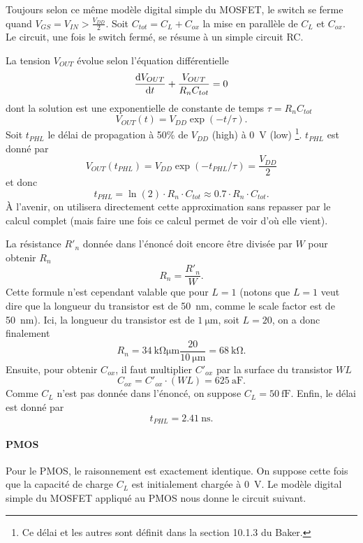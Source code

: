 \documentclass[frenchb,DIV=14]{scrartcl}
\begin{document}
Toujours selon ce même modèle digital simple du MOSFET, le switch se ferme
quand $V_{GS} = V_{IN} > \frac{V_{DD}}{2}$.
Soit $C_{tot} = C_L + C_{ox}$ la mise en parallèle de $C_L$ et $C_{ox}$. Le
circuit, une fois le switch fermé, se résume à un simple circuit RC.

\begin{center}
\end{center}

La tension $V_{OUT}$ évolue selon l'équation différentielle
\[ \frac{\operatorname{d}\! V_{OUT}}{\operatorname{d}\! t} + \frac{V_{OUT}}{R_nC_{tot}} = 0 \]
dont la solution est une exponentielle de constante de temps $\tau = R_nC_{tot}$
\[ V_{OUT}(t) = V_{DD}\exp\left(-t/\tau\right).\]
Soit $t_{PHL}$ le délai de propagation à 50\% de $V_{DD}$ (high) à \SI{0}{\volt} (low)
\footnote{Ce délai et les autres sont définit dans la section 10.1.3 du Baker.}.
$t_{PHL}$ est donné par
\[ V_{OUT}(t_{PHL}) = V_{DD}\exp\left(-t_{PHL}/\tau\right) = \frac{V_{DD}}{2} \]
et donc
\[ t_{PHL} = \ln(2)\cdot R_n\cdot C_{tot} \approx 0.7\cdot R_n\cdot C_{tot}. \]
\`{A} l'avenir, on utilisera directement cette approximation sans repasser par le calcul
complet (mais faire une fois ce calcul permet de voir d'où elle vient).

La résistance $R'_n$ donnée dans l'énoncé doit encore être divisée par $W$ pour
obtenir $R_n$
\[ R_n = \frac{R'_n}{W}. \]
Cette formule n'est cependant valable que pour $L=1$ (notons que $L=1$ veut
dire que la longueur du transistor est de \SI{50}{\nano\meter}, comme le
scale factor est de \SI{50}{\nano\meter}). Ici, la longueur du transistor
est de $\SI{1}{\micro\meter}$, soit $L=20$, on a donc finalement
\[ R_n = \SI{34}{\kilo\ohm\micro\meter}\frac{20}{\SI{10}{\micro\meter}} =
\SI{68}{\kilo\ohm}. \]
Ensuite, pour obtenir $C_{ox}$, il faut multiplier $C'_{ox}$ par la surface du
transistor $WL$
\[ C_{ox} = C'_{ox}\cdot(WL) = \SI{625}{\atto\farad}. \]
Comme $C_L$ n'est pas donnée dans l'énoncé, on suppose $C_L = \SI{50}{\femto\farad}$.
Enfin, le délai est donné par
\[ t_{PHL} = \SI{2.41}{\nano\second}. \]

\paragraph{PMOS}
Pour le PMOS, le raisonnement est exactement identique. On suppose cette fois que la
capacité de charge $C_L$ est initialement chargée à \SI{0}{\volt}. Le modèle digital
simple du MOSFET appliqué au PMOS nous donne le circuit suivant.
\end{document}
